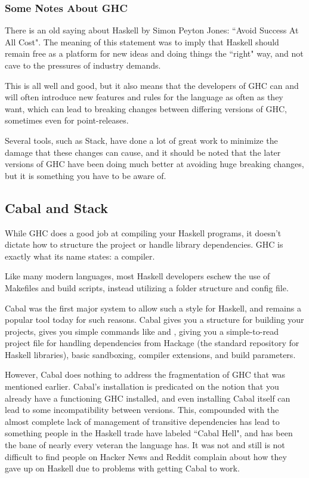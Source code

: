 \subsubsection{Some Notes About GHC} 
There is an old saying about Haskell by Simon Peyton Jones: ``Avoid Success At All Cost".  The meaning of this statement was to imply that Haskell should remain free as a platform for new ideas and doing things the ``right" way, and not cave to the pressures of industry demands. 

This is all well and good, but it also means that the developers of GHC can and will often introduce new features and rules for the language as often as they want, which can lead to breaking changes between differing versions of GHC, sometimes even for point-releases. 

Several tools, such as Stack, have done a lot of great work to minimize the damage that these changes can cause, and it should be noted that the later versions of GHC have been doing much better at avoiding huge breaking changes, but it is something you have to be aware of. 


\subsection{Cabal and Stack}
While GHC does a good job at compiling your Haskell programs, it doesn't dictate how to structure the project or handle library dependencies. GHC is exactly what its name states: a compiler. 

Like many modern languages, most Haskell developers eschew the use of Makefiles and build scripts, instead utilizing a folder structure and config file.  

Cabal was the first major system to allow such a style for Haskell, and remains a popular tool today for such reasons.  Cabal gives you a structure for building your projects, gives you simple commands like  and , giving you a simple-to-read project file for handling dependencies from Hackage (the standard repository for Haskell libraries), basic sandboxing, compiler extensions, and build parameters. 

However, Cabal does nothing to address the fragmentation of GHC that was mentioned earlier.  Cabal's installation is predicated on the notion that you already have a functioning GHC installed, and even installing Cabal itself can lead to some incompatibility between versions. This, compounded with the almost complete lack of management of transitive dependencies has lead to something people in the Haskell trade have labeled ``Cabal Hell", and has been the bane of nearly every veteran the language has. It was not and still is not difficult to find people on Hacker News and Reddit complain about how they gave up on Haskell due to problems with getting Cabal to work. 

